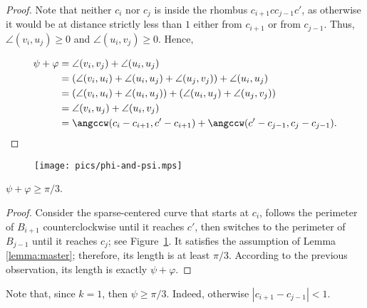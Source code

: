 \begin{enumerate}[label={\bf Case \arabic*: }, wide, labelwidth=!, labelindent=0pt]
\begin{observation}
\end{observation}

\begin{proof}
Note that neither $c_i$ nor $c_j$ is inside the rhombus $c_{i+1}cc_{j-1}c'$, as otherwise it would be at distance strictly less than $1$ either from $c_{i+1}$ or from $c_{j-1}$. Thus, $\angle(v_i, u_j)\geq 0$ and $\angle(u_i, v_j)\geq 0$. Hence,

\begin{align*}
\psi + \varphi & = \angle(v_i, v_j) + \angle(u_i, u_j) \\
&= (\angle(v_i, u_i) + \angle(u_i, u_j) + \angle(u_j, v_j)) + \angle(u_i, u_j) \\
&= (\angle(v_i, u_i) + \angle(u_i, u_j)) + (\angle(u_i, u_j) + \angle(u_j, v_j)) \\
&= \angle(v_i, u_j) + \angle(u_i, v_j) \\
&= \angccw(c_i - c_{i+1}, c' - c_{i+1}) + \angccw(c' - c_{j-1}, c_j - c_{j-1}).
\end{align*}
\end{proof}


\begin{figure}[h!]
    \centering
    \texttt{[image: pics/phi-and-psi.mps]}
    \caption{}
    \label{fig:phi-and-psi}
\end{figure}

\begin{observation}
$\psi + \varphi\geq \pi/3$.
\end{observation}

\begin{proof}
Consider the sparse-centered curve that starts at $c_i$, follows the perimeter of $B_{i+1}$ counterclockwise until it reaches $c'$, then switches to the perimeter of $B_{j-1}$ until it reaches $c_j$; see Figure~\ref{fig:phi-and-psi}. It satisfies the assumption of Lemma \ref{lemma:master}; therefore, its length is at least $\pi/3$. According to the previous observation, its length is exactly $\psi + \varphi$.
\end{proof}


Note that, since $k = 1$, then $\psi\geq\pi/3$. Indeed, otherwise $|c_{i+1} - c_{j-1}| < 1$. %


\end{enumerate}
